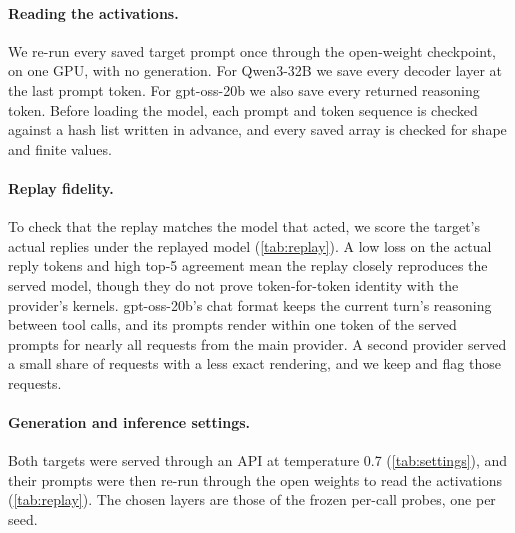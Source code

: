 \paragraph{Reading the activations.}
We re-run every saved target prompt once through the open-weight checkpoint, on one GPU, with no generation.
For Qwen3-32B we save every decoder layer at the last prompt token.
For gpt-oss-20b we also save every returned reasoning token.
Before loading the model, each prompt and token sequence is checked against a hash list written in advance, and every saved array is checked for shape and finite values.

\paragraph{Replay fidelity.}
To check that the replay matches the model that acted, we score the target's actual replies under the replayed model (\cref{tab:replay}).
A low loss on the actual reply tokens and high top-5 agreement mean the replay closely reproduces the served model, though they do not prove token-for-token identity with the provider's kernels.
gpt-oss-20b's chat format keeps the current turn's reasoning between tool calls, and its prompts render within one token of the served prompts for nearly all requests from the main provider.
A second provider served a small share of requests with a less exact rendering, and we keep and flag those requests.

\begin{table}[h]
  \centering
  \small
  
  \caption{Replay fidelity: loss of the actual reply tokens under the replayed model, and top-5 token agreement.}
  \label{tab:replay}
\end{table}

\paragraph{Generation and inference settings.}
Both targets were served through an API at temperature 0.7 (\cref{tab:settings}), and their prompts were then re-run through the open weights to read the activations (\cref{tab:replay}).
The chosen layers are those of the frozen per-call probes, one per seed.

\begin{table}[h]
  \centering
  \small
  
  \caption{Generation and inference settings.}
  \label{tab:settings}
\end{table}

